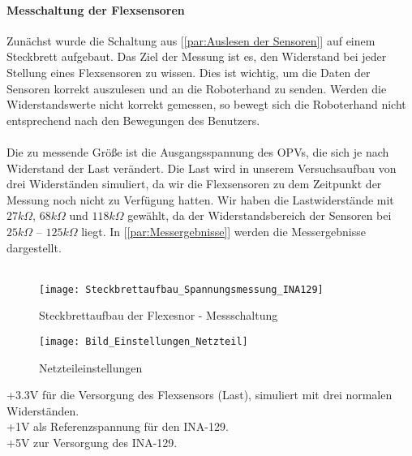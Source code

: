 \documentclass[titlepage,12pt,twoside]{article}
\begin{document}
\paragraph{Messchaltung der Flexsensoren}
\hfill \break
\hfill \break
Zunächst wurde die Schaltung aus [\textcolor{blue}{\autoref{par:Auslesen der Sensoren}}] auf einem Steckbrett aufgebaut. Das Ziel der Messung ist es, den Widerstand 
bei jeder Stellung eines Flexsensoren zu wissen. Dies ist wichtig, um die Daten der Sensoren korrekt auszulesen und an die 
Roboterhand zu senden. Werden die Widerstandswerte nicht korrekt gemessen, so bewegt sich die Roboterhand nicht entsprechend 
nach den Bewegungen des Benutzers. \\
\\
Die zu messende Größe ist die Ausgangsspannung des OPVs, die sich je nach Widerstand der Last verändert. Die Last wird in 
unserem Versuchsaufbau von drei Widerständen simuliert, da wir die Flexsensoren zu dem Zeitpunkt der Messung noch nicht zu 
Verfügung hatten. Wir haben die Lastwiderstände mit $27k\Omega$, $68k\Omega$ und $118k\Omega$ gewählt, da der Widerstandsbereich der Sensoren bei 
$25k\Omega$ – $125k\Omega$ liegt. In [\textcolor{blue}{\autoref{par:Messergebnisse}}] werden die Messergebnisse dargestellt. \\
\\
\begin{figure}[H]
	\begin{center}
		\scalebox{0.8}
		{\texttt{[image: Steckbrettaufbau\_Spannungsmessung\_INA129]}}
		\caption{Steckbrettaufbau der Flexesnor - Messschaltung}
		\label{fig:Steckbrettaufbau_Spannungsmessung_INA129}	
	\end{center}
\end{figure}
\hfill \break
\hfill \break
\begin{figure}[H]
	\begin{center}
		\scalebox{0.8}
		{\texttt{[image: Bild\_Einstellungen\_Netzteil]}}
		\caption{Netzteileinstellungen}
		\label{fig:Bild_Einstellungen_Netzteil}	
	\end{center}
\end{figure}
\hfill \break
+3.3V für die Versorgung des Flexsensors (Last), simuliert mit drei normalen Widerständen.\\
+1V als Referenzspannung für den INA-129.\\
+5V zur Versorgung des INA-129.\\
\\
\end{document}
